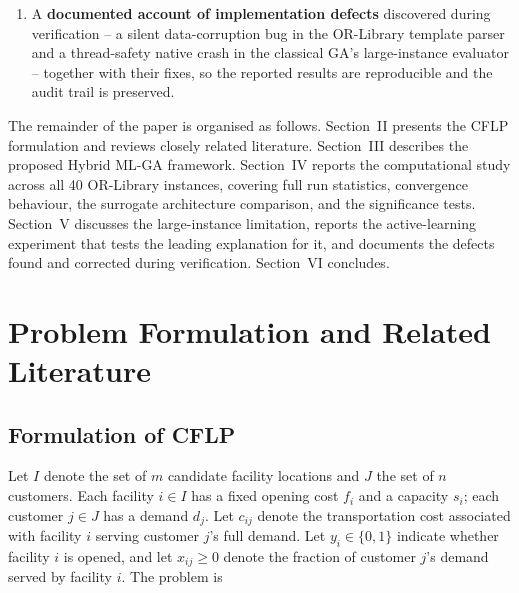 \documentclass[conference]{IEEEtran}
\begin{document}
\begin{enumerate}
    incumbent only after exact verification allows the surrogate to discard
    good candidates but never to contribute one. Robustness of individual-based
    model management above an accuracy threshold is already established
    \citep{hanawa2025}; the contribution here is that mandatory verification
    makes the decoupling exact rather than statistical, and makes it hold even
    for a catastrophically inaccurate surrogate far below any such threshold.
    This single mechanism accounts for both negative results above and
    delimits what surrogate-assisted CFLP search of this form can deliver.
    \item A \textbf{documented account of implementation defects} discovered
    during verification -- a silent data-corruption bug in the OR-Library
    template parser and a thread-safety native crash in the classical GA's
    large-instance evaluator -- together with their fixes, so the reported
    results are reproducible and the audit trail is preserved.
\end{enumerate}

The remainder of the paper is organised as follows. Section~II presents the
CFLP formulation and reviews closely related literature. Section~III
describes the proposed Hybrid ML-GA framework. Section~IV reports the
computational study across all 40 OR-Library instances, covering full run
statistics, convergence behaviour, the surrogate architecture comparison, and
the significance tests. Section~V discusses the large-instance limitation,
reports the active-learning experiment that tests the leading explanation for
it, and documents the defects found and corrected during verification.
Section~VI concludes.

\section{Problem Formulation and Related Literature}

\subsection{Formulation of CFLP}

Let $I$ denote the set of $m$ candidate facility locations and $J$ the set of
$n$ customers. Each facility $i \in I$ has a fixed opening cost $f_i$ and a
capacity $s_i$; each customer $j \in J$ has a demand $d_j$. Let $c_{ij}$
denote the transportation cost associated with facility $i$ serving customer
$j$'s full demand. Let $y_i \in \{0,1\}$ indicate whether facility $i$ is
opened, and let $x_{ij} \ge 0$ denote the fraction of customer $j$'s demand
served by facility $i$. The problem is
\end{document}
